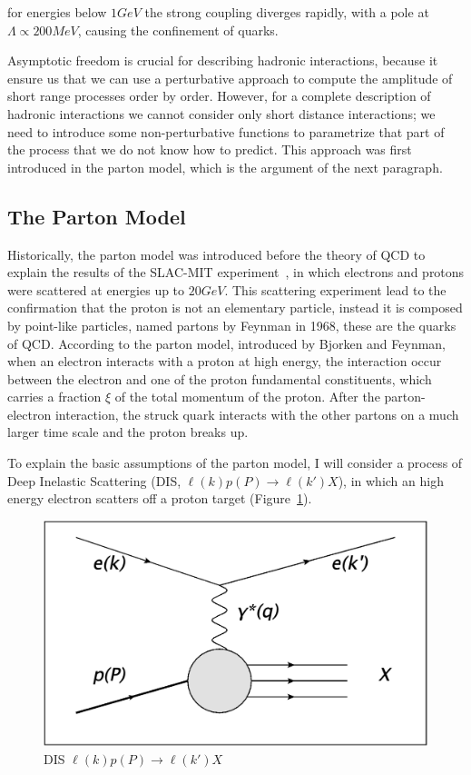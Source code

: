 for energies below $1 GeV$ the strong coupling diverges rapidly, with a pole at $\Lambda \propto 200 MeV$, causing the confinement of quarks.

Asymptotic freedom is crucial for describing hadronic interactions, because it ensure us that we can use a perturbative approach to compute the amplitude of short range processes order by order. However, for a complete description of hadronic interactions we cannot consider only short distance interactions; we need to introduce some non-perturbative functions to parametrize that part of the process that we do not know how to predict. This approach was first introduced in the parton model, which is the argument of the next paragraph.


\subsection[The Parton Model]{The Parton Model}
Historically, the parton model was introduced before the theory of QCD to explain the results of the SLAC-MIT experiment~\cite{Taylor:2000dg}, in which electrons and protons were scattered at energies up to $20 GeV$. This scattering experiment lead to the confirmation that the proton is not an elementary particle, instead it is composed by point-like particles, named partons by Feynman in 1968, these are the quarks of QCD. According to the parton model, introduced by Bjorken and Feynman, when an electron interacts with a proton at high energy, the interaction occur between the electron and one of the proton fundamental constituents, which carries a fraction $\xi$ of the total momentum of the proton. After the parton-electron interaction, the struck quark interacts with the other partons on a much larger time scale and the proton breaks up.

To explain the basic assumptions of the parton model, I will consider a process of Deep Inelastic Scattering (DIS, $\ell(k) p(P)  \to \ell(k') X$), in which an high energy electron scatters off a proton target (Figure~\ref{fig:DIS}).

\begin{figure}[htbp]
\begin{center}
\includegraphics[width=\textwidth]{Images/chapter1/DIS.png}
\caption{DIS $\ell(k) p(P)  \to \ell(k') X$}
\label{fig:DIS}
\end{center}
\end{figure}

